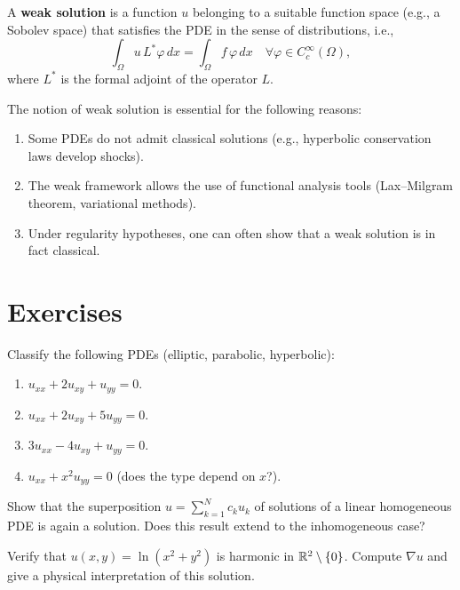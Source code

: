 \begin{definition}
A \textbf{weak solution} is a function $u$ belonging to a suitable function
space (e.g., a Sobolev space) that satisfies the PDE in the sense of
distributions, i.e.,
\[
    \int_\Omega u\, L^*\varphi\, dx = \int_\Omega f\, \varphi\, dx
    \quad \forall \varphi \in C_c^\infty(\Omega),
\]
where $L^*$ is the formal adjoint of the operator $L$.
\end{definition}

\begin{remark}
The notion of weak solution is essential for the following reasons:
\begin{enumerate}
    \item Some PDEs do not admit classical solutions (e.g., hyperbolic
          conservation laws develop shocks).
    \item The weak framework allows the use of functional analysis tools
          (Lax--Milgram theorem, variational methods).
    \item Under regularity hypotheses, one can often show that a weak
          solution is in fact classical.
\end{enumerate}
\end{remark}

\section{Exercises}

\begin{exercise}
Classify the following PDEs (elliptic, parabolic, hyperbolic):
\begin{enumerate}
    \item $u_{xx} + 2u_{xy} + u_{yy} = 0$.
    \item $u_{xx} + 2u_{xy} + 5u_{yy} = 0$.
    \item $3u_{xx} - 4u_{xy} + u_{yy} = 0$.
    \item $u_{xx} + x^2 u_{yy} = 0$ (does the type depend on $x$?).
\end{enumerate}
\end{exercise}

\begin{exercise}
Show that the superposition $u = \sum_{k=1}^{N} c_k u_k$ of solutions
of a linear homogeneous PDE is again a solution. Does this result extend
to the inhomogeneous case?
\end{exercise}

\begin{exercise}
Verify that $u(x,y) = \ln(x^2 + y^2)$ is harmonic in
$\mathbb{R}^2 \setminus \{0\}$. Compute $\nabla u$ and give a physical
interpretation of this solution.
\end{exercise}

